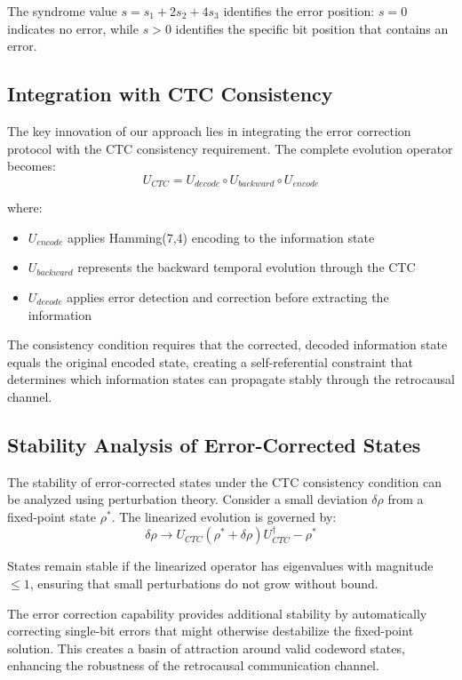 \documentclass[12pt,a4paper]{article}
\begin{document}
The syndrome value $s = s_1 + 2s_2 + 4s_3$ identifies the error position: $s = 0$ indicates no error, while $s > 0$ identifies the specific bit position that contains an error.

\subsection{Integration with CTC Consistency}

The key innovation of our approach lies in integrating the error correction protocol with the CTC consistency requirement. The complete evolution operator becomes:
\begin{equation}
U_{CTC} = U_{decode} \circ U_{backward} \circ U_{encode}
\end{equation}

where:
\begin{itemize}
\item $U_{encode}$ applies Hamming(7,4) encoding to the information state
\item $U_{backward}$ represents the backward temporal evolution through the CTC
\item $U_{decode}$ applies error detection and correction before extracting the information
\end{itemize}

The consistency condition requires that the corrected, decoded information state equals the original encoded state, creating a self-referential constraint that determines which information states can propagate stably through the retrocausal channel.

\subsection{Stability Analysis of Error-Corrected States}

The stability of error-corrected states under the CTC consistency condition can be analyzed using perturbation theory. Consider a small deviation $\delta\rho$ from a fixed-point state $\rho^*$. The linearized evolution is governed by:
\begin{equation}
\delta\rho \rightarrow U_{CTC} (\rho^* + \delta\rho) U_{CTC}^\dagger - \rho^*
\end{equation}

States remain stable if the linearized operator has eigenvalues with magnitude $\leq 1$, ensuring that small perturbations do not grow without bound.

The error correction capability provides additional stability by automatically correcting single-bit errors that might otherwise destabilize the fixed-point solution. This creates a basin of attraction around valid codeword states, enhancing the robustness of the retrocausal communication channel.
\end{document}

